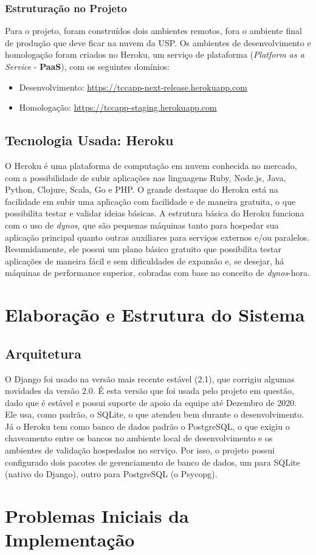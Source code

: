 \subsubsection{Estruturação no Projeto}
Para o projeto, foram construídos dois ambientes remotos, fora o ambiente final de produção que deve ficar na nuvem da USP. Os ambientes de desenvolvimento e homologação foram criados no Heroku, um serviço de plataforma (\textit{Platform as a Service} - \textbf{PaaS}), com os seguintes domínios:

\begin{itemize}
    \item Desenvolvimento: \href{https://tccapp-next-release.herokuapp.com}{https://tccapp-next-release.herokuapp.com}
    \item Homologação: \href{https://tccapp-staging.herokuapp.com}{https://tccapp-staging.herokuapp.com}
\end{itemize}

\subsection{Tecnologia Usada: Heroku}

O Heroku é uma plataforma de computação em nuvem conhecida no mercado, com a possibilidade de subir aplicações nas linguagens Ruby, Node.js, Java, Python, Clojure, Scala, Go e PHP. O grande destaque do Heroku está na facilidade em subir uma aplicação com facilidade e de maneira gratuita, o que possibilita testar e validar ideias básicas. A estrutura básica do Heroku funciona com o uso de \textit{dynos}, que são pequenas máquinas tanto para hospedar sua aplicação principal quanto outras auxiliares para serviços externos e/ou paralelos. Resumidamente, ele possui um plano básico gratuito que possibilita testar aplicações de maneira fácil e sem dificuldades de expansão e, se desejar, há máquinas de performance superior, cobradas com base no conceito de \textit{dynos}-hora.

\section{Elaboração e Estrutura do Sistema}
\subsection{Arquitetura}
O Django foi usado na versão mais recente estável (2.1), que corrigiu algumas novidades da versão 2.0. É esta versão que foi usada pelo projeto em questão, dado que é estável e possui suporte de apoio da equipe até Dezembro de 2020\cite{djangodownload}. Ele usa, como padrão, o SQLite, o que atendeu bem durante o desenvolvimento. Já o Heroku tem como banco de dados padrão o PostgreSQL, o que exigiu o chaveamento entre os bancos no ambiente local de desenvolvimento e os ambientes de validação hospedados no serviço. Por isso, o projeto possui configurado dois pacotes de gerenciamento de banco de dados, um para SQLite (nativo do Django), outro para PostgreSQL (o Psycopg\cite{lucassouto2017}).

\section{Problemas Iniciais da Implementação}